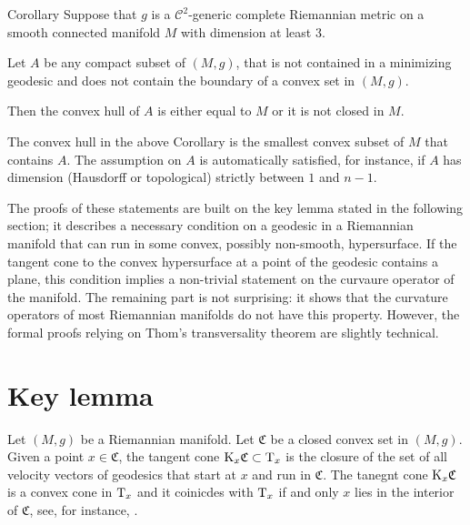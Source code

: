 \documentclass[a4paper,10pt]{article}
\begin{document}
\begin{thm}{Corollary}\label{cor:caratheodory}
Suppose that $g$ is a $\mathcal C^2$-generic complete Riemannian metric on a smooth connected manifold $M$ with dimension at least 3.
{\color{red} Let $A$ be any compact 
  subset 
of $(M,g)$,   {\color{red} that is not contained in a minimizing  geodesic and does not contain
	the boundary of a convex set in $(M,g)$.}

Then the convex hull of $A$ is either equal to $M$ or it is not closed in $M$.}
\end{thm}

{\color{red} The convex hull in the above Corollary is the smallest convex  subset of $M$ that contains $A$.  The assumption on  $A$ is automatically  satisfied, for instance, if $A$ has dimension (Hausdorff or topological) strictly between $1$ and $n-1$.}


The proofs of these statements are built on the key lemma stated in the following section; 
it describes a necessary condition on a geodesic in a Riemannian manifold that can run in some convex{\color{red}, possibly non-smooth, hypersurface.   If the tangent cone to the convex hypersurface at a point  of the geodesic contains a plane, this condition implies a non-trivial
statement on the curvaure operator of the manifold.
The remaining part is   not surprising:  it shows that the curvature operators of  most Riemannian manifolds do not have this property. However,  the formal proofs 
relying on 
 Thom's transversality theorem are slightly technical.}

\section{Key lemma}
Let $(M,g)$ be a Riemannian manifold.
Let $\mathfrak{C}$ be a closed convex set in $(M,g)$.
Given a point $x\in \mathfrak{C}$, 
{\color{red} the tangent cone $\mathrm{K}_x\mathfrak{C}\subset \mathrm{T}_x$ is  the closure of the set of all velocity vectors of geodesics that start at $x$ and run in $\mathfrak{C}$.  
The tanegnt cone $\mathrm{K}_x\mathfrak{C}$ is a convex cone in $\mathrm{T}_x$ and it coinicdes with 
$\mathrm{T}_x$  if and only 
$x$ lies in the interior of $\mathfrak{C}$, see, for instance, \cite{}.}
\end{document}
